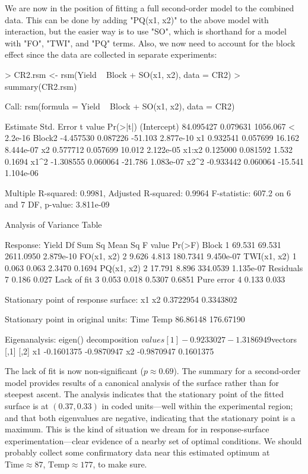 \documentclass[article,nojss]{jss}
\begin{document}
We are now in the position of fitting a full second-order model to the combined data.  This can be done by adding "PQ(x1, x2)" to the above model with interaction, but the easier way is to use "SO", which is shorthand for a model with "FO", "TWI", and "PQ" terms.  Also, we now need to account for the block effect since the data are collected in separate experiments:
\begin{Schunk}
\begin{Sinput}
> CR2.rsm <- rsm(Yield ~ Block + SO(x1, x2), data = CR2)
> summary(CR2.rsm)
\end{Sinput}
\begin{Soutput}
Call:
rsm(formula = Yield ~ Block + SO(x1, x2), data = CR2)

             Estimate Std. Error  t value  Pr(>|t|)
(Intercept) 84.095427   0.079631 1056.067 < 2.2e-16
Block2      -4.457530   0.087226  -51.103 2.877e-10
x1           0.932541   0.057699   16.162 8.444e-07
x2           0.577712   0.057699   10.012 2.122e-05
x1:x2        0.125000   0.081592    1.532    0.1694
x1^2        -1.308555   0.060064  -21.786 1.083e-07
x2^2        -0.933442   0.060064  -15.541 1.104e-06

Multiple R-squared:  0.9981,	Adjusted R-squared:  0.9964 
F-statistic: 607.2 on 6 and 7 DF,  p-value: 3.811e-09

Analysis of Variance Table

Response: Yield
            Df Sum Sq Mean Sq   F value    Pr(>F)
Block        1 69.531  69.531 2611.0950 2.879e-10
FO(x1, x2)   2  9.626   4.813  180.7341 9.450e-07
TWI(x1, x2)  1  0.063   0.063    2.3470    0.1694
PQ(x1, x2)   2 17.791   8.896  334.0539 1.135e-07
Residuals    7  0.186   0.027                    
Lack of fit  3  0.053   0.018    0.5307    0.6851
Pure error   4  0.133   0.033                    

Stationary point of response surface:
       x1        x2 
0.3722954 0.3343802 

Stationary point in original units:
     Time      Temp 
 86.86148 176.67190 

Eigenanalysis:
eigen() decomposition
$values
[1] -0.9233027 -1.3186949

$vectors
         [,1]       [,2]
x1 -0.1601375 -0.9870947
x2 -0.9870947  0.1601375
\end{Soutput}
\end{Schunk}
The lack of fit is now non-significant ($p \approx 0.69$).   The summary for a second-order model provides
results of a canonical analysis of the surface rather than for steepest ascent.  The analysis indicates that
the stationary point of the fitted surface is at $(0.37, 0.33)$ in coded units---well within the experimental region; and that both eigenvalues are negative, indicating that the stationary point is a maximum.  This is the kind of situation we dream for in response-surface experimentation---clear evidence of a nearby set of optimal conditions.  We should probably collect some confirmatory data near this estimated optimum at $\text{Time}\approx87$, $\text{Temp}\approx 177$, to make sure.
\end{document}
